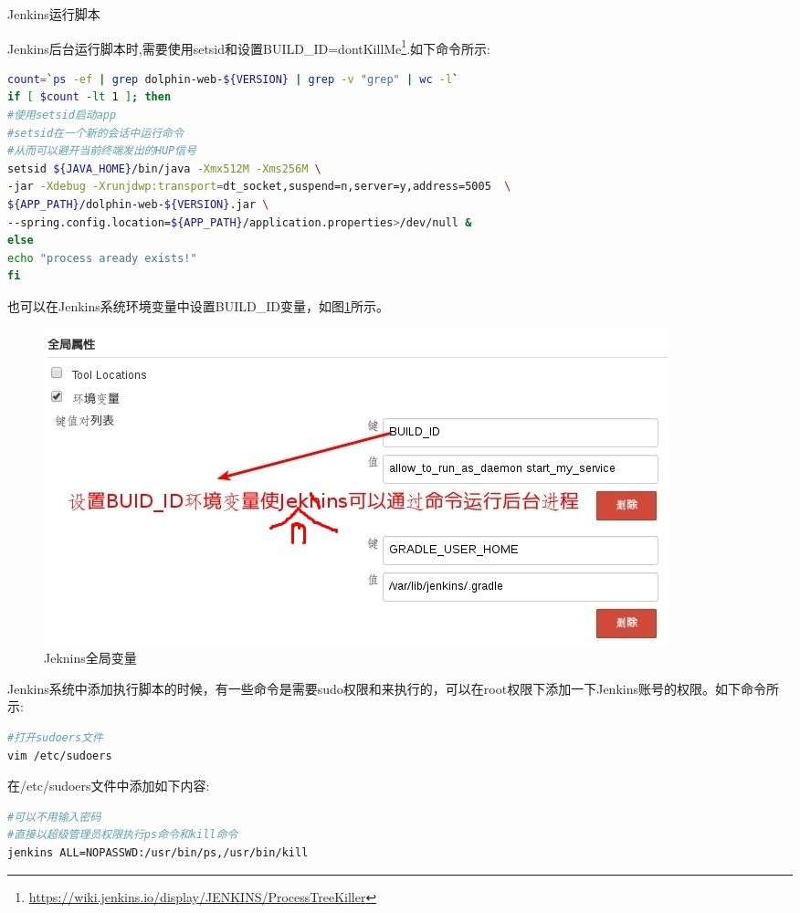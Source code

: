 \documentclass[12pt]{book}
\makeatletter
\numberwithin{dummy}{section}
\theoremstyle{ocrenumbox}
\theoremstyle{blacknumex}
\theoremstyle{blacknumbox}
\theoremstyle{ocrenum}
\renewcommand{\subsection}{\@startsection {subsection}{2}{\z@}
	{-3ex \@plus -0.1ex \@minus -.4ex}
	{0.5ex \@plus.2ex }
	{\normalfont\sffamily\bfseries}}
\makeatother
\begin{document}
\subsection{Jenkins运行脚本}

Jenkins后台运行脚本时,需要使用setsid和设置BUILD\_ID=dontKillMe\footnote{\url{https://wiki.jenkins.io/display/JENKINS/ProcessTreeKiller}}.如下命令所示:

\begin{lstlisting}[language=bash]
count=`ps -ef | grep dolphin-web-${VERSION} | grep -v "grep" | wc -l`
if [ $count -lt 1 ]; then
#使用setsid启动app
#setsid在一个新的会话中运行命令
#从而可以避开当前终端发出的HUP信号
setsid ${JAVA_HOME}/bin/java -Xmx512M -Xms256M \
-jar -Xdebug -Xrunjdwp:transport=dt_socket,suspend=n,server=y,address=5005	\
${APP_PATH}/dolphin-web-${VERSION}.jar \
--spring.config.location=${APP_PATH}/application.properties>/dev/null &
else
echo "process aready exists!"
fi
\end{lstlisting}

也可以在Jenkins系统环境变量中设置BUILD\_ID变量，如图\ref{fig:jenkinsbuildidsetting}所示。

\begin{figure}[htbp]
	\centering
	\includegraphics[scale=0.5]{jenkinsbuildidsetting.jpg}
	\caption{Jeknins全局变量}
	\label{fig:jenkinsbuildidsetting}
\end{figure}

Jenkins系统中添加执行脚本的时候，有一些命令是需要sudo权限和来执行的，可以在root权限下添加一下Jenkins账号的权限。如下命令所示:

\begin{lstlisting}[language=bash]
#打开sudoers文件
vim /etc/sudoers
\end{lstlisting}

在/etc/sudoers文件中添加如下内容:

\begin{lstlisting}[language=bash]
#可以不用输入密码
#直接以超级管理员权限执行ps命令和kill命令
jenkins ALL=NOPASSWD:/usr/bin/ps,/usr/bin/kill
\end{lstlisting}
\end{document}
